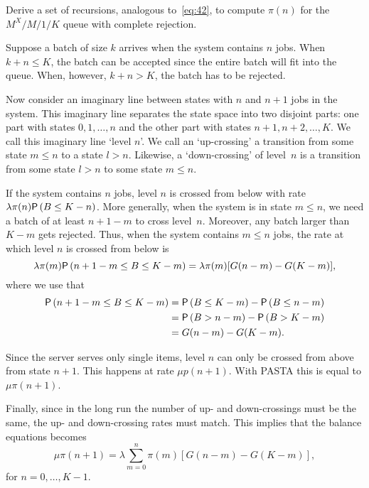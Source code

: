 \documentclass[companion]{subfiles}
\begin{document}
\begin{exercise}
 Derive a set of recursions, analogous to~\cref{eq:42}, to compute $\pi(n)$ for the $M^X/M/1/K$ queue with complete rejection.
\begin{solution}
 Suppose a batch of size $k$ arrives when the system contains $n$ jobs.
 When $k+n \leq K$, the batch can be accepted since the entire batch will fit into the queue.
 When, however, $k+n> K$, the batch has to be rejected.

 Now consider an imaginary line between states with $n$ and $n+1$ jobs in the system.
 This imaginary line separates the state space into two disjoint parts: one part with states $0, 1, \ldots, n$ and the other part with states $n+1, n+2, \ldots, K$.
 We call this imaginary line `level $n$'.
 We call an `up-crossing' a transition from some state $m\leq n$ to a state $l> n$.
 Likewise, a `down-crossing' of level~$n$ is a transition from some state $l> n$ to some state $m\leq n$.

 If the system contains $n$ jobs, level $n$ is crossed from below with rate $\lambda \pi(n) \P{B \leq K-n}$.
 More generally, when the system is in state $m\leq n$, we need a batch of at least $n+1-m$ to cross level~$n$.
 Moreover, any batch larger than $K-m$ gets rejected.
 Thus, when the system contains $m \leq n $ jobs, the rate at which level $n$ is crossed from below is
 \begin{equation*}
 \lambda \pi(m) \P{n+1-m\leq B \leq K-m} = \lambda \pi(m)
 [G(n-m)-G(K-m)],
 \end{equation*}
where we use that
\begin{align*}
\P{n+1-m\leq B \leq K-m} 
&= \P{B \leq K-m} - \P{B \leq n-m} \\
&= \P{B > n-m} - \P{B > K-m} \\
&= G(n-m)-G(K-m).
\end{align*}

 Since the server serves only single items, level $n$ can only be
 crossed from above from state $n+1$. This happens at rate $\mu p(n+1)$. With PASTA this is equal to $\mu \pi(n+1)$.

 Finally, since in the long run the number of up- and down-crossings must
 be the same, the up- and down-crossing rates must match. This implies
 that the balance equations becomes
 \begin{equation*}
 \mu \pi(n+1) = \lambda \sum_{m=0}^n \pi(m) [G(n-m)-G(K-m)],
 \end{equation*}
 for $n=0,\ldots, K-1$. 


\end{solution}
\end{exercise}
\end{document}
